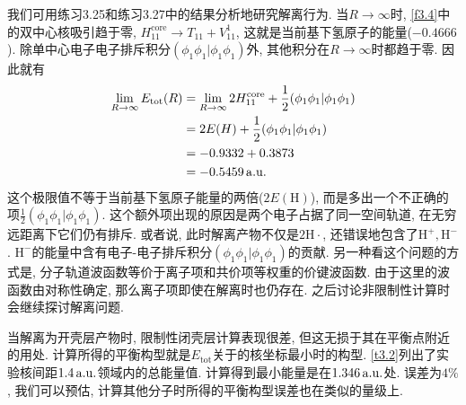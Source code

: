 我们可用练习3.25和练习3.27中的结果分析地研究解离行为. 
当$R\to\infty$时, 
\autoref{f3.4}中的双中心核吸引趋于零, 
$H_{11}^\mathrm{core}\to T_{11}+V_{11}^1$, 
这就是当前基下氢原子的能量($-0.4666$). 
除单中心电子电子排斥积分$(\phi_1\phi_1|\phi_1\phi_1)$外, 
其他积分在$R\to \infty$时都趋于零. 
因此就有
\begin{align*}
	\lim_{R\to\infty} E_\mathrm{tot}(R) & = \lim_{R\to\infty} 2H_{11}^\mathrm{core} + \frac{1}{2}(\phi_1\phi_1|\phi_1\phi_1) \\
	& = 2E(H) + \frac{1}{2}(\phi_1\phi_1|\phi_1\phi_1)                                   \\
	& = -0.9332 + 0.3873                                                                 \\
	& = -0.5459\,\mathrm{a.u.}
\end{align*}
这个极限值不等于当前基下氢原子能量的两倍($2E(\mathrm{H})$), 
而是多出一个不正确的项$\frac{1}{2}(\phi_1\phi_1|\phi_1\phi_1)$. 
这个额外项出现的原因是两个电子占据了同一空间轨道, 
在无穷远距离下它们仍有排斥. 
或者说, 此时解离产物不仅是$2\mathrm{H}\cdot$, 
还错误地包含了$\mathrm{H}^+,\mathrm{H}^-$. 
$\mathrm{H}^-$的能量中含有电子-电子排斥积分$(\phi_1\phi_1|\phi_1\phi_1)$的贡献. 
另一种看这个问题的方式是, 
分子轨道波函数等价于离子项和共价项等权重的价键波函数. 
由于这里的波函数由对称性确定, 
那么离子项即使在解离时也仍存在. 
之后讨论非限制性\hft 计算时会继续探讨解离问题.


当解离为开壳层产物时, 
限制性闭壳层\hft 计算表现很差, 
但这无损于其在平衡点附近的用处. 
计算所得的平衡构型就是$E_\mathrm{tot}$关于的核坐标最小时的构型. 
\autoref{t3.2}列出了实验核间距$1.4\,\mathrm{a.u.}$领域内的总能量值. 
计算得到最小能量是在$1.346\,\mathrm{a.u.}$处. 
误差为$4\%$, 
我们可以预估, 
计算其他分子时所得的平衡构型误差也在类似的量级上. 

